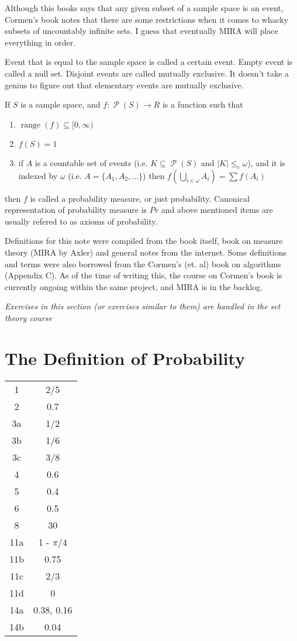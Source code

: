 \documentclass[11pt,oneside,titlepage]{book}
\DeclareMathOperator \pow {\mathcal {P}}
\DeclareMathOperator \range {range}
\newcommand{\set}[1]{\{ #1 \}}
\begin{document}
Although this books says that any given subset of a sample space is an event, Cormen's
book notes that there are some restrictions when it comes to whacky subsets of uncountably infinite
sets. I guess that eventually MIRA will place everything in order.

Event that is equal to the sample space is called a certain event. Empty event is
called a null set. Disjoint events are called mutually exclusive. It doesn't take
a genius to figure out that elementary events are mutually exclusive.

If $S$ is a sample space, and $f: \pow(S) \to R$ is a function such that
\begin{enumerate}
\item $\range(f) \subseteq [0, \infty)$
\item $f(S) = 1$
\item if $A$ is a countable set of events (i.e. $K \subseteq \pow(S)$ and $|K| \leq_c \omega$),
  and it is indexed by $\omega$  (i.e. $A = \set{A_1, A_2, ...}$) then
  $f(\bigcup_{i \in \omega}{A_i}) = \sum{f(A_i)}$
\end{enumerate}
then $f$ is called a probability measure, or just probability. Canonical representation of
probability measure is $Pr$ and above mentioned items are usually refered to as
axioms of probability.

Definitions for this note were compiled from the book itself, book on measure theory (MIRA by Axler)
and general notes from the internet. Some definitions and terms were also borrowed from
the Cormen's (et. al) book on algorithms (Appendix C). As of the time of writing this, the
course on Cormen's book is currently ongoing within the same project, and MIRA is in the backlog.

\textit{Exercises in this section (or exercises similar to them) are handled in the set theory
  course}

\section{The Definition of Probability}

\begin{tabular}[center]{||c | c|| }
  \hline
  1 & 2/5 \\
  2 & 0.7 \\
  3a & 1/2 \\
  3b & 1/6 \\
  3c & 3/8 \\
  4 & 0.6 \\
  5 & 0.4 \\
  6 & 0.5 \\
  8 & 30 \\
  11a & 1 - $\pi/4$ \\
  11b & 0.75 \\
  11c & 2/3\\
  11d & 0 \\
  14a & 0.38, 0.16 \\
  14b & 0.04 \\
  \hline 
\end{tabular}
\end{document}
